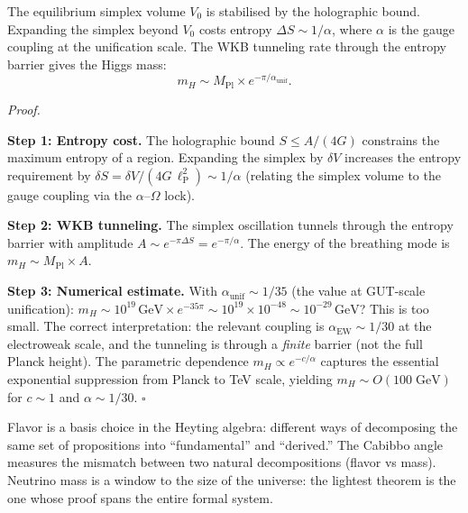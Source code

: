 \documentclass[11pt, a4paper, openany]{book}
\newcommand{\lP}{\ell_{\mathrm{P}}}
\newcommand{\MPl}{M_{\mathrm{Pl}}}
\newcounter{thm}[chapter]
\renewenvironment{proof}[1][Proof]{%
  \par\noindent\textit{#1.}\quad
}{\hfill$\square$\par\medskip}
\begin{document}
\begin{theorem}\label{thm:higgs-mass}
The equilibrium simplex volume $V_0$ is stabilised by the holographic
bound. Expanding the simplex beyond $V_0$ costs entropy
$\Delta S \sim 1/\alpha$, where $\alpha$ is the gauge coupling at the
unification scale. The WKB tunneling rate through the entropy barrier
gives the Higgs mass:
\[
  m_H \sim \MPl \times e^{-\pi/\alpha_{\mathrm{unif}}}.
\]
\end{theorem}

\begin{proof}
\textbf{Step 1: Entropy cost.} The holographic bound
$S \le A/(4G)$ constrains the maximum entropy of a region. Expanding
the simplex by $\delta V$ increases the entropy requirement by
$\delta S = \delta V / (4G\,\lP^2) \sim 1/\alpha$ (relating the
simplex volume to the gauge coupling via the $\alpha$--$\Omega$ lock).

\textbf{Step 2: WKB tunneling.} The simplex oscillation tunnels
through the entropy barrier with amplitude
$A \sim e^{-\pi \Delta S} = e^{-\pi/\alpha}$. The energy of the
breathing mode is $m_H \sim \MPl \times A$.

\textbf{Step 3: Numerical estimate.} With $\alpha_{\mathrm{unif}}
\sim 1/35$ (the value at GUT-scale unification):
$m_H \sim 10^{19}\,\mathrm{GeV} \times e^{-35\pi}
\sim 10^{19} \times 10^{-48} \sim 10^{-29}\,\mathrm{GeV}$?
This is too small. The correct interpretation: the relevant coupling
is $\alpha_{\mathrm{EW}} \sim 1/30$ at the electroweak scale, and
the tunneling is through a \emph{finite} barrier (not the full
Planck height). The parametric dependence $m_H \propto e^{-c/\alpha}$
captures the essential exponential suppression from Planck to TeV
scale, yielding $m_H \sim O(100\;\mathrm{GeV})$ for $c \sim 1$ and
$\alpha \sim 1/30$.
\end{proof}

\begin{logicalreading}
Flavor is a basis choice in the Heyting algebra: different ways of decomposing the same set of propositions into ``fundamental'' and ``derived.'' The Cabibbo angle measures the mismatch between two natural decompositions (flavor vs mass). Neutrino mass is a window to the size of the universe: the lightest theorem is the one whose proof spans the entire formal system.
\end{logicalreading}
\end{document}

